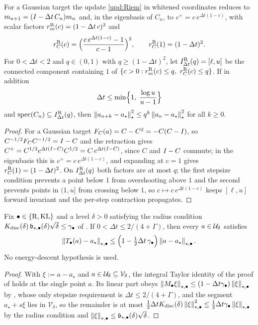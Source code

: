 \begin{proposition}
\label{prop:Gauss-Riem-map}
For a Gaussian target the update \eqref{upd:Riem} in whitened coordinates reduces to
$m_{n+1}=(I-\Delta t\,C_n)m_n$ and, in the eigenbasis of $C_n$, to
$c^+=c\,e^{\Delta t(1-c)}$, with scalar factors $r_m^{\mathrm{R}}(c)=(1-\Delta t\,c)^2$ and
\[
    r_C^{\mathrm{R}}(c)=\Bigl(\frac{c\,e^{\Delta t(1-c)}-1}{c-1}\Bigr)^2,
    \qquad r_C^{\mathrm{R}}(1)=(1-\Delta t)^2 .
\]
For $0<\Delta t<2$ and $q\in(0,1)$ with $q\geq(1-\Delta t)^2$, let
$I_{\Delta t}^{\mathrm{R}}(q)=[\ell,u]$ be the connected component containing $1$ of
$\{c>0:r_m^\Riem(c)\leq q,\ r_C^\Riem(c)\leq q\}$. If in addition
\[
    \Delta t\leq\min\Bigl\{1,\;\frac{\log u}{u-1}\Bigr\}
\]
and $\operatorname{spec}(C_n)\subseteq I_{\Delta t}^{\mathrm{R}}(q)$, then
$\left\lVert a_{n+k}-a_\star\right\rVert_\star^2\leq q^k\left\lVert a_n-a_\star\right\rVert_\star^2$ for all $k\geq0$.
\end{proposition}

\begin{proof}
For a Gaussian target $F_C(a)=C-C^2=-C(C-I)$, so $C^{-1/2}F_CC^{-1/2}=I-C$ and the
retraction gives $C^+=C^{1/2}e^{\Delta t(I-C)}C^{1/2}=C\,e^{\Delta t(I-C)}$, since $C$ and
$I-C$ commute; in the eigenbasis this is $c^+=c\,e^{\Delta t(1-c)}$, and expanding at $c=1$
gives $r_C^{\mathrm{R}}(1)=(1-\Delta t)^2$. On $I_{\Delta t}^{\mathrm{R}}(q)$ both factors are at most $q$;
the first stepsize condition prevents a point below $1$ from overshooting above $1$ and the
second prevents points in $(1,u]$ from crossing below $1$, so $c\mapsto c\,e^{\Delta t(1-c)}$
keeps $[\ell,u]$ forward invariant and the per-step contraction propagates.
\end{proof}

\begin{lemma}
\label{lem:loc-contraction}
Fix $\bullet\in\{\mathrm{R},\mathrm{KL}\}$ and a level $\delta>0$ satisfying the radius condition
$K_{\mathrm{disc}}(\delta)\,\mathfrak b_{\star,\bullet}(\delta)\sqrt\delta\leq\gamma_\bullet$ of
. If $0<\Delta t\leq2/(4+\Gamma)$, then every $a\in\mathcal{U}_\delta$
satisfies
\[
    \left\lVert T_\bullet(a)-a_\star\right\rVert_{\star,\bullet}
    \leq\Bigl(1-\tfrac12\Delta t\,\gamma_\bullet\Bigr)\left\lVert a-a_\star\right\rVert_{\star,\bullet}.
\]
No energy-descent hypothesis is used.
\end{lemma}

\begin{proof}
With $\xi:=a-a_\star$ and $a\in\mathcal{U}_\delta\subseteq\mathcal V_\delta$, the integral Taylor
identity of the proof of  holds at the single point $a$. Its linear part obeys
$\left\lVert M_\bullet\xi\right\rVert_{\star,\bullet}\leq(1-\Delta t\gamma_\bullet)\left\lVert \xi\right\rVert_{\star,\bullet}$ by
, whose only stepsize requirement is $\Delta t\leq2/(4+\Gamma)$, and
the segment $a_\star+s\xi$ lies in $\mathcal V_\delta$, so the remainder is at most
$\tfrac12\Delta tK_{\mathrm{disc}}(\delta)\left\lVert \xi\right\rVert_{\star,\bullet}^2\leq\tfrac12\Delta t\gamma_\bullet\left\lVert \xi\right\rVert_{\star,\bullet}$
by the radius condition and $\left\lVert \xi\right\rVert_{\star,\bullet}\leq\mathfrak b_{\star,\bullet}(\delta)\sqrt\delta$.
\end{proof}

